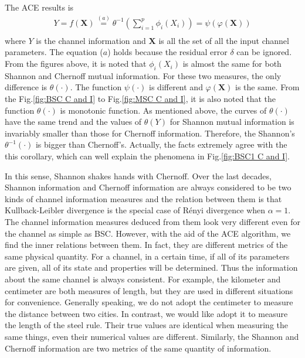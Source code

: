 \documentclass[conference]{IEEEtran}
\begin{document}
 The ACE results is
\begin{equation}\label{Res_Fun}
\begin{aligned}
Y = f\left( {\textbf{X}}   \right)  \overset{(a)}{=}{\theta ^{ - 1}}\left( {\sum\limits_{i = 1}^p {{\phi _i}({X_i})} } \right)= \psi \left( {\varphi \left( { {\textbf{X}} } \right)} \right)\\
 \end{aligned}
\end{equation}
where $Y$ is the channel information and ${\textbf{X}}$ is all the set of all the input channel parameters. The equation ($a$) holds because the residual error $\delta$ can be ignored. From the figures above, it is noted that $ \phi_i(X_i)$ is almost the same for both Shannon and Chernoff mutual information. For these two measures, the only difference is $\theta(\cdot)$. The function $\psi(\cdot)$ is different and ${\varphi \left( { {\textbf{X}} } \right)} $ is the same. From the Fig.\ref{fig:BSC C and I} to Fig.\ref{fig:MSC C and I}, it is also noted that the function $\theta(\cdot)$ is monotonic function. As mentioned above, the curves of $\theta(\cdot)$ have the same trend and the values of $\theta(Y)$ for Shannon mutual information is invariably smaller than those for Chernoff information. Therefore, the Shannon's $\theta^{-1}(\cdot)$ is bigger than Chernoff's. Actually, the facts extremely agree with the this corollary, which can well explain the phenomena in Fig.\ref{fig:BSC1 C and I}.

 In this sense, Shannon shakes hands with Chernoff. Over the last decades, Shannon information and Chernoff information are always considered to be two kinds of channel information measures and the relation between them is that Kullback-Leibler divergence is the special case of R{\'{e}}nyi divergence when $\alpha=1$. The channel information measures deduced from them look very different even for the channel as simple as BSC. However, with the aid of the ACE algorithm, we find the inner relations between them. In fact, they are different metrics of the same physical quantity. For a channel, in a certain time, if all of its parameters are given, all of its state and properties will be determined. Thus the information about the same channel is always consistent. For example, the kilometer and centimeter are both measures of length, but they are used in different situations for convenience. Generally speaking, we do not adopt the centimeter to measure the distance between two cities. In contrast, we would like adopt it to measure the length of the steel rule. Their true values are identical when measuring the same things, even their numerical values are different. Similarly, the Shannon and Chernoff information are two metrics of the same quantity of information.
\end{document}
